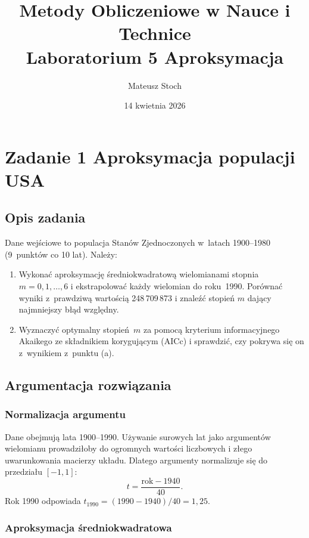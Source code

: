\documentclass[12pt, a4paper]{article}
\title{
  \textbf{Metody Obliczeniowe w Nauce i Technice} \\[0.5em]
  \large Laboratorium 5 \textemdash{} Aproksymacja
}
\author{Mateusz Stoch}
\date{14 kwietnia 2026}
\begin{document}
\maketitle

\section{Zadanie 1 \textemdash{} Aproksymacja populacji USA}

\subsection{Opis zadania}

Dane wejściowe to populacja Stanów Zjednoczonych w~latach 1900--1980
(9~punktów co 10 lat). Należy:
\begin{enumerate}
  \item[(a)] Wykonać aproksymację średniokwadratową wielomianami stopnia
             $m = 0, 1, \ldots, 6$ i ekstrapolować każdy wielomian do
             roku~1990. Porównać wyniki z~prawdziwą wartością
             248\,709\,873 i znaleźć stopień $m$ dający najmniejszy
             błąd względny.
  \item[(b)] Wyznaczyć optymalny stopień~$m$ za pomocą kryterium
             informacyjnego Akaikego ze składnikiem korygującym
             (AICc) i sprawdzić, czy pokrywa się on z~wynikiem
             z~punktu (a).
\end{enumerate}

\subsection{Argumentacja rozwiązania}

\subsubsection{Normalizacja argumentu}

Dane obejmują lata 1900--1990. Używanie surowych lat jako argumentów
wielomianu prowadziłoby do ogromnych wartości liczbowych i złego
uwarunkowania macierzy układu. Dlatego argumenty normalizuje się do
przedziału $[-1, 1]$:
\[
  t = \frac{\text{rok} - 1940}{40}.
\]
Rok 1990 odpowiada $t_{1990} = (1990 - 1940) / 40 = 1{,}25$.

\subsubsection{Aproksymacja średniokwadratowa}
\end{document}

